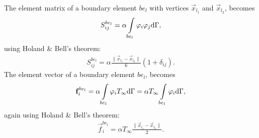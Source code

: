 The element matrix of a boundary element $be_l$ with vertices $\vec{x}_{l_1}$ and $\vec{x}_{l_2}$, becomes
\begin{gather*}
    S_{ij}^{be_l} = \alpha \int\displaylimits_{be_l}\varphi_i \varphi_j \mathrm{d}\Gamma,
\end{gather*} using Holand \& Bell's theorem:
\begin{gather}
    S_{ij}^{be_l} = \alpha \frac{\lVert \vec{x}_{l_1} - \vec{x}_{l_2} \rVert}{6} \left( 1 + \delta_{ij} \right).
\end{gather}
The element vector of a boundary element $be_l$, becomes
\begin{gather*}
    \vec{f}_i^{be_l} = \alpha \int\displaylimits_{be_l}\varphi_i T_{\infty} \mathrm{d}\Gamma = \alpha T_{\infty} \int\displaylimits_{be_l}\varphi_i \mathrm{d}\Gamma,
\end{gather*} again using Holand \& Bell's theorem:
\begin{gather}
    \vec{f}_i^{be_l} = \alpha T_{\infty} \frac{\lVert \vec{x}_{l_1} - \vec{x}_{l_2} \rVert}{2}.
\end{gather}